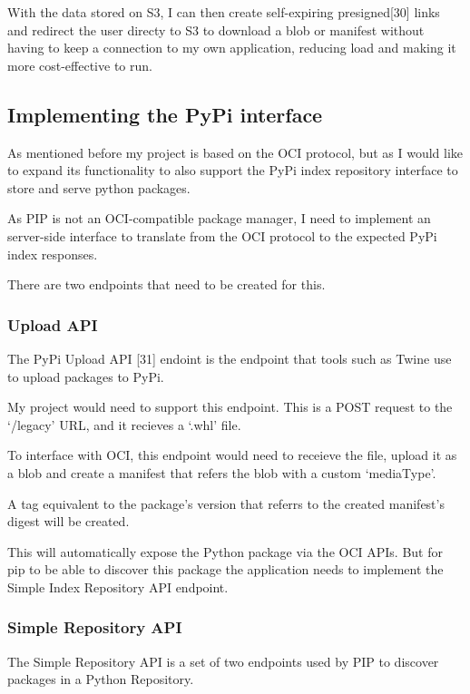 \documentclass{article}
\begin{document}
  With the data stored on S3, I can then create self-expiring presigned[30] links and redirect the user directy to S3 to download a blob or manifest without having to keep a connection to my own application, reducing load and making it more cost-effective to run.

  \subsection{Implementing the PyPi interface}

  As mentioned before my project is based on the OCI protocol, but as I would like to expand its functionality to also support the PyPi index repository interface to store and serve python packages.

  As PIP is not an OCI-compatible package manager, I need to implement an server-side interface to translate from the OCI protocol to the expected PyPi index responses.

  There are two endpoints that need to be created for this.

  \subsubsection{Upload API}

  The PyPi Upload API [31] endoint is the endpoint that tools such as Twine use to upload packages to PyPi. 

  My project would need to support this endpoint. This is a POST request to the `/legacy' URL, and it recieves a `.whl' file.

  To interface with OCI, this endpoint would need to receieve the file, upload it as a blob and create a manifest that refers the blob with a custom `mediaType'.

  A tag equivalent to the package's version that referrs to the created manifest's digest will be created.
  
  This will automatically expose the Python package via the OCI APIs. But for pip to be able to discover this package the application needs to implement the Simple Index Repository API endpoint.

  \subsubsection{Simple Repository API}

  The Simple Repository API is a set of two endpoints used by PIP to discover packages in a Python Repository.
\end{document}
